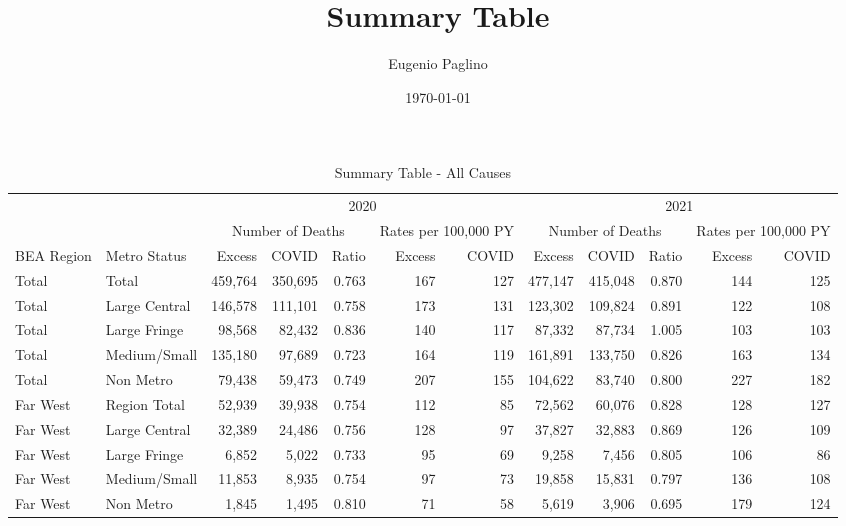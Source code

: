 \documentclass[
]{article}
\title{Summary Table}
\author{Eugenio Paglino}
\date{\today}
\begin{document}
\maketitle

\begin{table}

\caption{\label{tab:unnamed-chunk-8}Summary Table - All Causes}
\centering
\fontsize{7.5}{9.5}\selectfont
\begin{tabular}[t]{llrrrrrrrrrr}
\toprule
\multicolumn{2}{c}{ } & \multicolumn{5}{c}{2020} & \multicolumn{5}{c}{2021} \\
\cmidrule(l{3pt}r{3pt}){3-7} \cmidrule(l{3pt}r{3pt}){8-12}
\multicolumn{2}{c}{ } & \multicolumn{3}{c}{Number of Deaths} & \multicolumn{2}{c}{Rates per 100,000 PY} & \multicolumn{3}{c}{Number of Deaths} & \multicolumn{2}{c}{Rates per 100,000 PY} \\
\cmidrule(l{3pt}r{3pt}){3-5} \cmidrule(l{3pt}r{3pt}){6-7} \cmidrule(l{3pt}r{3pt}){8-10} \cmidrule(l{3pt}r{3pt}){11-12}
BEA Region & Metro Status & Excess & COVID & Ratio & Excess & COVID & Excess & COVID & Ratio & Excess & COVID\\
\midrule
Total & Total & 459,764 & 350,695 & 0.763 & 167 & 127 & 477,147 & 415,048 & 0.870 & 144 & 125\\
\addlinespace[2pt]
Total & Large Central & 146,578 & 111,101 & 0.758 & 173 & 131 & 123,302 & 109,824 & 0.891 & 122 & 108\\
Total & Large Fringe & 98,568 & 82,432 & 0.836 & 140 & 117 & 87,332 & 87,734 & 1.005 & 103 & 103\\
Total & Medium/Small & 135,180 & 97,689 & 0.723 & 164 & 119 & 161,891 & 133,750 & 0.826 & 163 & 134\\
Total & Non Metro & 79,438 & 59,473 & 0.749 & 207 & 155 & 104,622 & 83,740 & 0.800 & 227 & 182\\
\addlinespace[5pt]
Far West & Region Total & 52,939 & 39,938 & 0.754 & 112 & 85 & 72,562 & 60,076 & 0.828 & 128 & 127\\
\addlinespace[2pt]
Far West & Large Central & 32,389 & 24,486 & 0.756 & 128 & 97 & 37,827 & 32,883 & 0.869 & 126 & 109\\
Far West & Large Fringe & 6,852 & 5,022 & 0.733 & 95 & 69 & 9,258 & 7,456 & 0.805 & 106 & 86\\
Far West & Medium/Small & 11,853 & 8,935 & 0.754 & 97 & 73 & 19,858 & 15,831 & 0.797 & 136 & 108\\
Far West & Non Metro & 1,845 & 1,495 & 0.810 & 71 & 58 & 5,619 & 3,906 & 0.695 & 179 & 124\\

\end{tabular}
\end{table}
\end{document}
